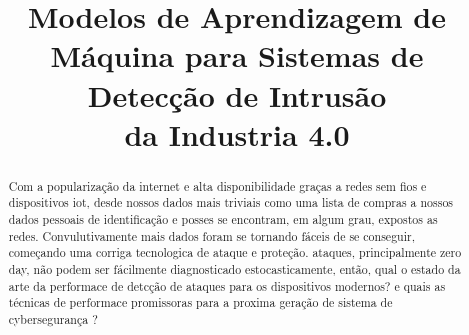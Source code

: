 \documentclass[conference]{IEEEtran}
\begin{document}
\title{Modelos de Aprendizagem de Máquina para Sistemas de Detecção de Intrusão\\
{\footnotesize \textsuperscript{}}{da Industria 4.0 }
}
\author{
\and
{}
\and
{}
\and
{}
}

\maketitle

\begin{abstract}
Com a popularização da internet e alta disponibilidade graças a redes sem fios e dispositivos iot, desde nossos dados mais triviais como uma lista de compras a nossos dados pessoais de identificação e posses se encontram, em algum grau, expostos as redes. Convulutivamente mais dados foram se tornando fáceis de se conseguir, começando uma corriga tecnologica de ataque e proteção. ataques, principalmente zero day, não podem ser fácilmente diagnosticado estocasticamente, então, qual o estado da arte da performace de detcção de ataques para os dispositivos modernos? e quais as técnicas de performace promissoras para a proxima geração de sistema de cybersegurança ?

\end{abstract}
\end{document}
